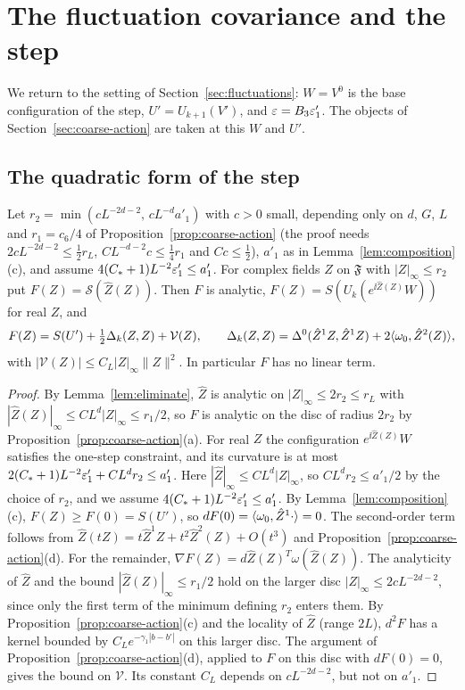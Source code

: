 \section{The fluctuation covariance and the step}\label{sec:covariance}

We return to the setting of Section~\ref{sec:fluctuations}: $W=V^0$ is the base configuration of the step, $U'=U_{k+1}(V')$, and $\varepsilon=B_3\varepsilon'_1$. The objects of Section~\ref{sec:coarse-action} are taken at this $W$ and $U'$.

\subsection{The quadratic form of the step}

\begin{lemma}\label{lem:step-quadratic}
Let $r_2=\min(cL^{-2d-2},\,cL^{-d}a'_1)$ with $c>0$ small, depending only on $d$, $G$, $L$ and $r_1=c_6/4$ of Proposition~\ref{prop:coarse-action} (the proof needs $2cL^{-2d-2}\le\frac12r_L$, $CL^{-d-2}c\le\frac14r_1$ and $Cc\le\frac12$), $a'_1$ as in Lemma~\ref{lem:composition}(c), and assume $4(C_*+1)L^{-2}\varepsilon'_1\le a'_1$. For complex fields $Z$ on $\mathfrak F$ with $|Z|_\infty\le r_2$ put $F(Z)=\mathcal S(\hat Z(Z))$. Then $F$ is analytic, $F(Z)=S(U_k(e^{\ii\hat Z(Z)}W))$ for real $Z$, and
\[
F(Z)=S(U')+\tfrac12\Delta_k(Z,Z)+\mathcal V(Z),\qquad\Delta_k(Z,Z)=\Delta^0(\hat Z^1Z,\hat Z^1Z)+2\langle \omega_0,\hat Z^2(Z)\rangle,
\]
with $|\mathcal V(Z)|\le C_L|Z|_\infty\|Z\|^2$. In particular $F$ has no linear term.
\end{lemma}

\begin{proof}
By Lemma~\ref{lem:eliminate}, $\hat Z$ is analytic on $|Z|_\infty\le2r_2\le r_L$ with $|\hat Z(Z)|_\infty\le CL^d|Z|_\infty\le r_1/2$, so $F$ is analytic on the disc of radius $2r_2$ by Proposition~\ref{prop:coarse-action}(a). For real $Z$ the configuration $e^{\ii\hat Z(Z)}W$ satisfies the one-step constraint, and its curvature is at most $2(C_*+1)L^{-2}\varepsilon'_1+CL^dr_2\le a'_1$. Here $|\hat Z|_\infty\le CL^d|Z|_\infty$, so $CL^dr_2\le a'_1/2$ by the choice of $r_2$, and we assume $4(C_*+1)L^{-2}\varepsilon'_1\le a'_1$. By Lemma~\ref{lem:composition}(c), $F(Z)\ge F(0)=S(U')$, so $dF(0)=\langle \omega_0,\hat Z^1\cdot\rangle=0$. The second-order term follows from $\hat Z(tZ)=t\hat Z^1Z+t^2\hat Z^2(Z)+O(t^3)$ and Proposition~\ref{prop:coarse-action}(d). For the remainder, $\nabla F(Z)=d\hat Z(Z)^T\omega(\hat Z(Z))$. The analyticity of $\hat Z$ and the bound $|\hat Z(Z)|_\infty\le r_1/2$ hold on the larger disc $|Z|_\infty\le2cL^{-2d-2}$, since only the first term of the minimum defining $r_2$ enters them. By Proposition~\ref{prop:coarse-action}(c) and the locality of $\hat Z$ (range $2L$), $d^2F$ has a kernel bounded by $C_Le^{-\gamma_1|b-b'|}$ on this larger disc. The argument of Proposition~\ref{prop:coarse-action}(d), applied to $F$ on this disc with $dF(0)=0$, gives the bound on $\mathcal V$. Its constant $C_L$ depends on $cL^{-2d-2}$, but not on $a'_1$.
\end{proof}

